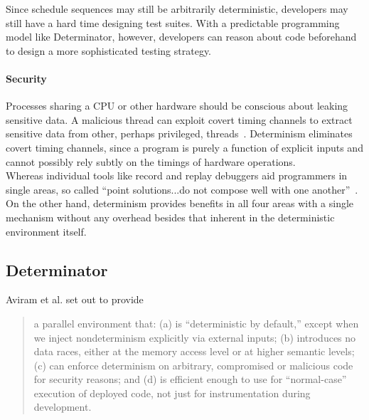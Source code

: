 Since schedule sequences may still be arbitrarily deterministic, developers may
still have a hard time designing test suites. With a predictable programming
model like Determinator, however, developers can reason about code beforehand
to design a more sophisticated testing strategy.

\paragraph{Security} Processes sharing a CPU or other hardware should be
conscious about leaking sensitive data. A malicious thread can exploit covert
timing channels to extract sensitive data from other, perhaps privileged,
threads~\cite{Aviram10cloud}. Determinism eliminates covert timing channels,
since a program is purely a function of explicit inputs and cannot possibly rely
subtly on the timings of hardware operations.
\\

Whereas individual tools like record and replay debuggers aid programmers
in single areas, so called ``point solutions...do not compose well with one
another''~\cite{Bergan11}. On the other hand, determinism provides benefits in
all four areas with a single mechanism without any overhead besides that
inherent in the deterministic environment itself.

\iffalse
To further motivate determinism, we consider ``point solutions'' that
solve problems in single areas at
once. Record and replay debuggers, like Leblanc et al.'s Instant Replay
system, aid in debugging parallel programs by logging scheduling sequences and
other relevant interactions in order to replay an execution sequence exactly.
However, these debuggers are costly in terms of storage and performance.
\iffalse Even with replay ability, the execution sequence is still arbitrary and
gives the programmer no intuition about the program's behavior. \fi
In general, these ``point solutions...do not compose well with one
another''~\cite{Bergan11}. On the other hand, determinism provides benefits in
all four areas at once with a single mechanism without any additional overhead
besides that inherent in the deterministic environment.
\fi

\subsection{Determinator}

Aviram et al. set out to provide
\begin{quote}
a parallel environment that:
(a) is ``deterministic by default,'' except when
we inject nondeterminism explicitly via external inputs;
(b) introduces no data races, either at the memory access level
or at higher semantic levels; (c)
can enforce determinism on arbitrary, compromised or
malicious code for security reasons; and (d) is efficient
enough to use for ``normal-case'' execution of deployed
code, not just for instrumentation during development. \cite{Aviram10}
\end{quote}

